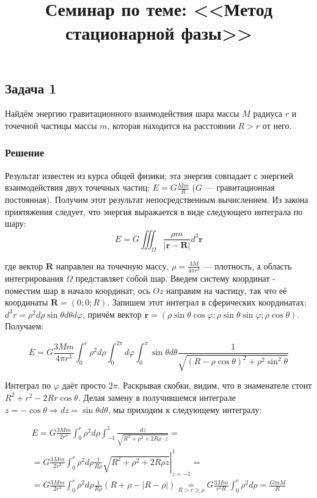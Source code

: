 \documentclass[a4paper,12pt]{article}
\begin{document}
\title{Семинар по теме: <<Метод стационарной фазы>>}
\maketitle

\subsection*{Задача 1}

Найдём энергию гравитационного взаимодействия шара массы $M$ радиуса
$r$ и точечной частицы массы $m$, которая находится на расстоянии
$R>r$ от него.


\subsubsection*{Решение}

Результат известен из курса общей физики; эта энергия совпадает с
энергией взаимодействия двух точечных частиц: $E=G\frac{Mm}{R}$ ($G$
--- гравитационная постоянная). Получим этот результат непосредственным
вычислением. Из закона приятяжения следует, что энергия выражается
в виде следующего интеграла по шару:
\[
E=G\iiint_{\Omega}\frac{\rho m}{\left|\mathbf{r}-\mathbf{R}\right|}d^{3}\mathbf{r}
\]

 \noindent
где вектор $\mathbf{R}$ направлен на точечную массу, $\rho=\frac{3M}{4\pi r^{3}}$
--- плотность, а область интегрирования $\Omega$ представляет собой
шар. Введем систему координат - поместим шар в начало координат; ось
$Oz$ направим на частицу, так что её координаты $\mathbf{R}=(0;0;R)$.
Запишем этот интеграл в сферических координатах: $d^{3}r=\rho^{2}d\rho\sin\theta d\theta d\varphi$,
причём вектор $\mathbf{r}=\left(\rho\sin\theta\cos\varphi;\rho\sin\theta\sin\varphi;\rho\cos\theta\right)$.
Получаем:

\[
E=G\frac{3Mm}{4\pi r^{3}}\int_{0}^{r}\rho^{2}d\rho\int_{0}^{2\pi}d\varphi\int_{0}^{\pi}\sin\theta d\theta\frac{1}{\sqrt{(R-\rho\cos\theta)^{2}+\rho^{2}\sin^{2}\theta}}
\]

 \noindent
Интеграл по $\varphi$ даёт просто $2\pi$. Раскрывая скобки, видим,
что в знаменателе стоит $R^{2}+r^{2}-2Rr\cos\theta$. Делая замену
в получившемся интеграле $z=-\cos\theta\Rightarrow dz=\sin\theta d\theta$,
мы приходим к следующему интегралу:

\begin{multline*}
E=G\frac{3Mm}{2r^{3}}\int_{0}^{r}\rho^{2}d\rho\int_{-1}^{1}\frac{dz}{\sqrt{R^{2}+\rho^{2}+2R\rho\cdot z}}=\\
=G\frac{3Mm}{2r^{3}}\int_{0}^{r}\rho^{2}d\rho\frac{1}{R\rho}\left.\sqrt{R^{2}+\rho^{2}+2R\rho z}\right|_{z=-1}^{1}=\\
=G\frac{3Mm}{2r^{3}}\int_{0}^{r}\rho^{2}d\rho\frac{1}{R\rho}(R+\rho-|R-\rho|)\underset{R>r\geq\rho}{=}G\frac{3Mm}{r^{3}R}\int_{0}^{r}\rho^{2}d\rho=\frac{GmM}{R}
\end{multline*}
\end{document}
